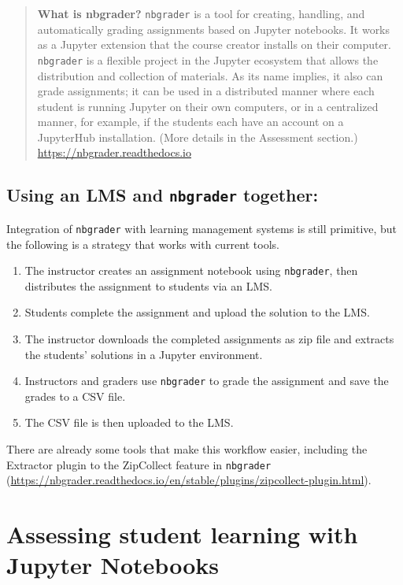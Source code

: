 \documentclass[]{book}
\begin{document}
\begin{quote}
\textbf{What is nbgrader?} \texttt{nbgrader} is a tool for creating,
handling, and automatically grading assignments based on Jupyter
notebooks. It works as a Jupyter extension that the course creator
installs on their computer. \texttt{nbgrader} is a flexible project in
the Jupyter ecosystem that allows the distribution and collection of
materials. As its name implies, it also can grade assignments; it can be
used in a distributed manner where each student is running Jupyter on
their own computers, or in a centralized manner, for example, if the
students each have an account on a JupyterHub installation. (More
details in the Assessment section.)
\url{https://nbgrader.readthedocs.io}
\end{quote}

\subsection{\texorpdfstring{Using an LMS and \texttt{nbgrader}
together:}{Using an LMS and nbgrader together:}}\label{using-an-lms-and-nbgrader-together}

Integration of \texttt{nbgrader} with learning management systems is
still primitive, but the following is a strategy that works with current
tools.

\begin{enumerate}
\def\labelenumi{\arabic{enumi}.}
\item
  The instructor creates an assignment notebook using \texttt{nbgrader},
  then distributes the assignment to students via an LMS.
\item
  Students complete the assignment and upload the solution to the LMS.
\item
  The instructor downloads the completed assignments as zip file and
  extracts the students' solutions in a Jupyter environment.
\item
  Instructors and graders use \texttt{nbgrader} to grade the assignment
  and save the grades to a CSV file.
\item
  The CSV file is then uploaded to the LMS.
\end{enumerate}

There are already some tools that make this workflow easier, including
the Extractor plugin to the ZipCollect feature in \texttt{nbgrader}
(\url{https://nbgrader.readthedocs.io/en/stable/plugins/zipcollect-plugin.html}).

\section{Assessing student learning with Jupyter
Notebooks}\label{assessing-student-learning-with-jupyter-notebooks}
\end{document}
